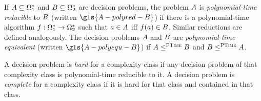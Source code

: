 If $A \subseteq \Omega^{*}_1$ and $B \subseteq \Omega^{*}_2$ are
decision problems, the problem $A$ is \emph{polynomial-time reducible} to
$B$ (written $\gls{A-polyred-B}$) if there is a polynomial-time algorithm $f :
\Omega^{*}_1 \to \Omega^{*}_2$ such that $a \in A$ iff $f(a) \in
B$. Similar reductions are defined analogously.
The decision problems $A$ and $B$ are \emph{polynomial-time equivalent}
(written $\gls{A-polyequ-B}$) if $A \leq^{\text{\normalfont{\scshape PTime}}} B$ and $B \leq^{\text{\normalfont{\scshape PTime}}} A$.

A decision problem is \emph{hard} for a complexity class if any decision problem
of that complexity class is polynomial-time reducible to it. A decision problem
is \emph{complete} for a complexity class if it is hard for that class and
contained in that class.